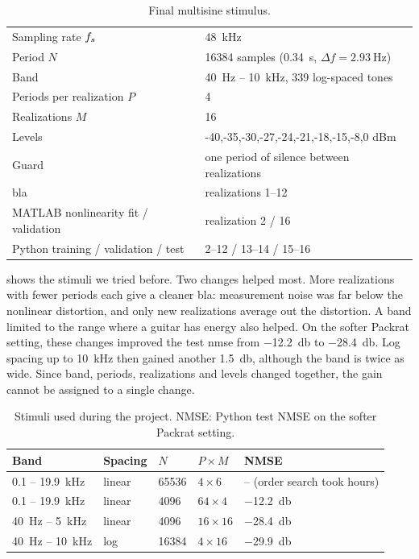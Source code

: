 \begin{table}[htbp]
  \centering
  \caption{Final multisine stimulus.}
  \label{tab:impl_stimulus}
  \begin{tabular}{ll}
    \toprule
    Sampling rate $f\sb{s}$ & \SI{48}{\kilo\hertz} \\
    Period $N$ & 16384 samples (\SI{0.34}{\second}, $\Delta f = \SI{2.93}{\hertz}$) \\
    Band & \SI{40}{\hertz} -- \SI{10}{\kilo\hertz}, 339 log-spaced tones \\
    Periods per realization $P$ & 4 \\
    Realizations $M$ & 16 \\
    Levels & -40,-35,-30,-27,-24,-21,-18,-15,-8,0 {dBm} \\
    Guard & one period of silence between realizations \\
    \midrule
    \gls{bla} & realizations 1--12 \\
    MATLAB nonlinearity fit / validation & realization 2 / 16 \\
    Python training / validation / test & 2--12 / 13--14 / 15--16 \\
    \bottomrule
  \end{tabular}
\end{table}

 shows the stimuli we tried before. Two changes helped most. More realizations with fewer periods each give a cleaner \gls{bla}: measurement noise was far below the nonlinear distortion, and only new realizations average out the distortion. A band limited to the range where a guitar has energy also helped. On the softer Packrat setting, these changes improved the test \gls{nmse} from \SI{-12.2}{\decibel} to \SI{-28.4}{\decibel}. Log spacing up to \SI{10}{\kilo\hertz} then gained another \SI{1.5}{\decibel}, although the band is twice as wide. Since band, periods, realizations and levels changed together, the gain cannot be assigned to a single change.

\begin{table}[htbp]
  \centering
  \caption{Stimuli used during the project. NMSE: Python test NMSE on the softer Packrat setting.}
  \label{tab:impl_stimulus_tried}
  \begin{tabular}{lllll}
    \toprule
    Band & Spacing & $N$ & $P \times M$ & NMSE \\
    \midrule
    \SI{0.1}{} -- \SI{19.9}{\kilo\hertz} & linear & 65536 & $4 \times 6$ & -- (order search took hours) \\
    \SI{0.1}{} -- \SI{19.9}{\kilo\hertz} & linear & 4096 & $64 \times 4$ & \SI{-12.2}{\decibel} \\
    \SI{40}{\hertz} -- \SI{5}{\kilo\hertz} & linear & 4096 & $16 \times 16$ & \SI{-28.4}{\decibel} \\
    \SI{40}{\hertz} -- \SI{10}{\kilo\hertz} & log & 16384 & $4 \times 16$ & \SI{-29.9}{\decibel} \\
    \bottomrule
  \end{tabular}
\end{table}

